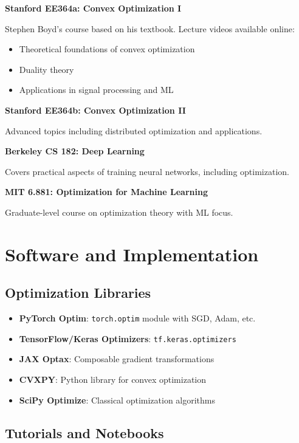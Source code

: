\documentclass[../main.tex]{subfiles}
\begin{document}
\textbf{Stanford EE364a: Convex Optimization I}

Stephen Boyd's course based on his textbook. Lecture videos available online:
\begin{itemize}
    \item Theoretical foundations of convex optimization
    \item Duality theory
    \item Applications in signal processing and ML
\end{itemize}

\textbf{Stanford EE364b: Convex Optimization II}

Advanced topics including distributed optimization and applications.

\textbf{Berkeley CS 182: Deep Learning}

Covers practical aspects of training neural networks, including optimization.

\textbf{MIT 6.881: Optimization for Machine Learning}

Graduate-level course on optimization theory with ML focus.

\section{Software and Implementation}

\subsection{Optimization Libraries}

\begin{itemize}
    \item \textbf{PyTorch Optim}: \texttt{torch.optim} module with SGD, Adam, etc.
    \item \textbf{TensorFlow/Keras Optimizers}: \texttt{tf.keras.optimizers}
    \item \textbf{JAX Optax}: Composable gradient transformations
    \item \textbf{CVXPY}: Python library for convex optimization
    \item \textbf{SciPy Optimize}: Classical optimization algorithms
\end{itemize}

\subsection{Tutorials and Notebooks}
\end{document}
